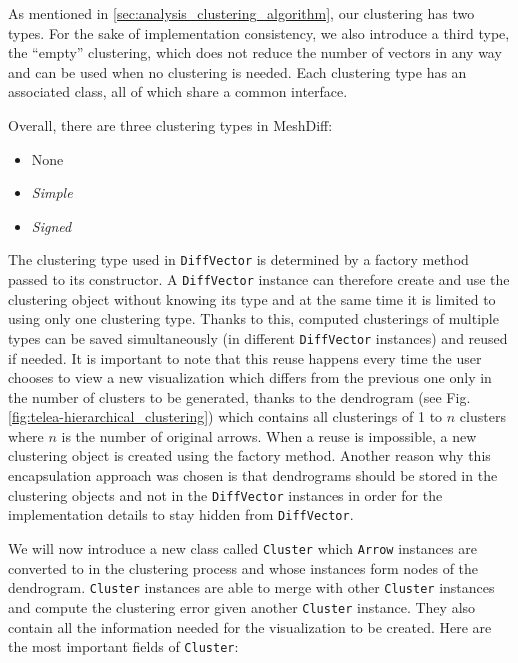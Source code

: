 As mentioned in \ref{sec:analysis_clustering_algorithm}, our clustering has two types. For the sake of implementation consistency, we also introduce a third type, the ``empty'' clustering, which does not reduce the number of vectors in any way and can be used when no clustering is needed. Each clustering type has an associated class, all of which share a common interface.

Overall, there are three clustering types in MeshDiff:

\begin{itemize}
\item None
\item {\it Simple}
\item {\it Signed}
\end{itemize}

The clustering type used in \verb+DiffVector+ is determined by a factory method passed to its constructor. A \verb+DiffVector+ instance can therefore create and use the clustering object without knowing its type and at the same time it is limited to using only one clustering type. Thanks to this, computed clusterings of multiple types can be saved simultaneously (in different \verb+DiffVector+ instances) and reused if needed. It is important to note that this reuse happens every time the user chooses to view a new visualization which differs from the previous one only in the number of clusters to be generated, thanks to the dendrogram (see Fig. \ref{fig:telea-hierarchical_clustering}) which contains all clusterings of 1 to \(n\) clusters where \(n\) is the number of original arrows. When a reuse is impossible, a new clustering object is created using the factory method. Another reason why this encapsulation approach was chosen is that dendrograms should be stored in the clustering objects and not in the \verb+DiffVector+ instances in order for the implementation details to stay hidden from \verb+DiffVector+.

We will now introduce a new class called \verb+Cluster+ which \verb+Arrow+ instances are converted to in the clustering process and whose instances form nodes of the dendrogram. \verb+Cluster+ instances are able to merge with other \verb+Cluster+ instances and compute the clustering error given another \verb+Cluster+ instance. They also contain all the information needed for the visualization to be created. Here are the most important fields of \verb+Cluster+:

